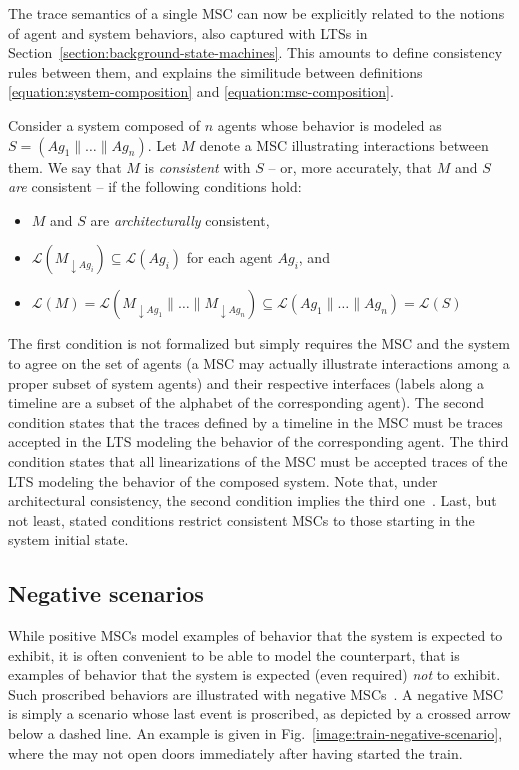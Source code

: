 The trace semantics of a single MSC can now be explicitly related to the notions of agent and system behaviors, also captured with LTSs in Section~\ref{section:background-state-machines}. This amounts to define consistency rules between them, and explains the similitude between definitions \ref{equation:system-composition} and \ref{equation:msc-composition}.

Consider a system composed of $n$ agents whose behavior is modeled as $S = (Ag_1 \parallel \ldots \parallel Ag_n)$. Let $M$ denote a MSC illustrating interactions between them. We say that $M$ is \emph{consistent} with $S$ -- or, more accurately, that $M$ and $S$ \emph{are} consistent -- if the following conditions hold:

\begin{itemize}
\item $M$ and $S$ are \emph{architecturally} consistent,
\item $\mathcal{L}(M_{\downarrow Ag_i}) \subseteq \mathcal{L}(Ag_i)$ for each agent $Ag_i$, and
\item $\mathcal{L}(M) = \mathcal{L}(M_{\downarrow Ag_1} \parallel \ldots \parallel M_{\downarrow Ag_n}) \subseteq \mathcal{L}(Ag_1 \parallel \ldots \parallel Ag_n) = \mathcal{L}(S)$
\end{itemize}

The first condition is not formalized but simply requires the MSC and the system to agree on the set of agents (a MSC may actually illustrate interactions among a proper subset of system agents) and their respective interfaces (labels along a timeline are a subset of the alphabet of the corresponding agent). The second condition states that the traces defined by a timeline in the MSC must be traces accepted in the LTS modeling the behavior of the corresponding agent. The third condition states that all linearizations of the MSC must be accepted traces of the LTS modeling the behavior of the composed system. Note that, under architectural consistency, the second condition implies the third one~\cite{Uchitel:2003}. Last, but not least, stated conditions restrict consistent MSCs to those starting in the system initial state.

\subsection{Negative scenarios}

While positive MSCs model examples of behavior that the system is expected to exhibit, it is often convenient to be able to model the counterpart, that is examples of behavior that the system is expected (even required) \emph{not} to exhibit. Such proscribed behaviors are illustrated with negative MSCs~\cite{Uchitel:2004}. A negative MSC is simply a scenario whose last event is proscribed, as depicted by a crossed arrow below a dashed line. An example is given in Fig.~\ref{image:train-negative-scenario}, where the  may not open doors immediately after having started the train.

